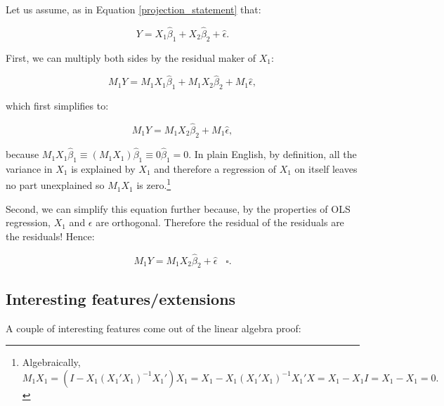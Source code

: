 \documentclass[
]{book}
\begin{document}
Let us assume, as in Equation \ref{projection_statement} that:

\begin{equation}
    Y = X_1\hat{\beta}_1 + X_2\hat{\beta}_2 + \hat{\epsilon}. \label{eq:multivar}
\end{equation}

First, we can multiply both sides by the residual maker of \(X_1\):

\begin{equation}
    M_1Y = M_1X_1\hat{\beta}_1 + M_1X_2\hat{\beta}_2 + M_1\hat{\epsilon},
\end{equation}

which first simplifies to:

\begin{equation}
    M_1Y = M_1X_2\hat{\beta}_2 + M_1\hat{\epsilon}, \label{eq:part_simp}
\end{equation}

because \(M_1X_1\hat{\beta}_1 \equiv (M_1X_1)\hat{\beta}_1 \equiv 0\hat{\beta}_1 = 0\). In plain English, by definition, all the variance in \(X_1\) is explained by \(X_1\) and therefore a regression of \(X_1\) on itself leaves no part unexplained so \(M_1X_1\) is zero.\footnote{Algebraically, $M_1X_1 = (I-X_1(X_{1}'X_1)^{-1}X_1')X_1 = X_1 - X_1(X_1'X_1)^{-1}X_1'X = X_1 - X_1I = X_1 - X_1 = 0.$}

Second, we can simplify this equation further because, by the properties of OLS regression, \(X_1\) and \(\epsilon\) are orthogonal. Therefore the residual of the residuals are the residuals! Hence:

\begin{equation*}
    M_1Y = M_1X_2\hat{\beta}_2 + \hat{\epsilon} \; \; \; \square.
\end{equation*}

\subsection{Interesting features/extensions}

A couple of interesting features come out of the linear algebra proof:
\end{document}
